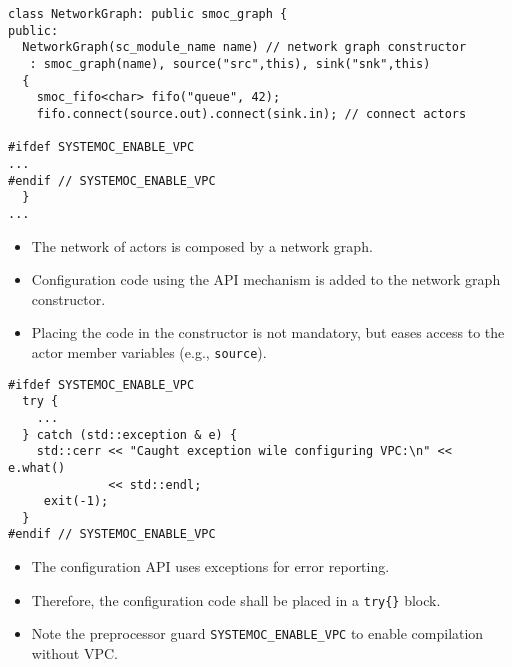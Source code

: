 \begin{frame}[fragile=singleslide]
\begin{lstlisting}
class NetworkGraph: public smoc_graph {
public:
  NetworkGraph(sc_module_name name) // network graph constructor
   : smoc_graph(name), source("src",this), sink("snk",this)
  {
    smoc_fifo<char> fifo("queue", 42);
    fifo.connect(source.out).connect(sink.in); // connect actors

#ifdef SYSTEMOC_ENABLE_VPC
...
#endif // SYSTEMOC_ENABLE_VPC
  }
...
\end{lstlisting}
\begin{itemize}
\item The network of actors is composed by a network graph.
\item Configuration code using the API mechanism is added to the network graph constructor.
\item Placing the code in the constructor is not mandatory, but eases access to the actor member variables (e.g., \lstinline!source!).
\end{itemize}
\end{frame}


\begin{frame}[fragile=singleslide]
\begin{lstlisting}
#ifdef SYSTEMOC_ENABLE_VPC
  try {
    ...
  } catch (std::exception & e) {
    std::cerr << "Caught exception wile configuring VPC:\n" << e.what()
              << std::endl;
     exit(-1);
  }
#endif // SYSTEMOC_ENABLE_VPC
\end{lstlisting}
\begin{itemize}
\item The configuration API uses exceptions for error reporting.
\item Therefore, the configuration code shall be placed in a \lstinline!try{}! block.
\item Note the preprocessor guard \lstinline!SYSTEMOC_ENABLE_VPC! to enable compilation without VPC.
\end{itemize}
\end{frame}


